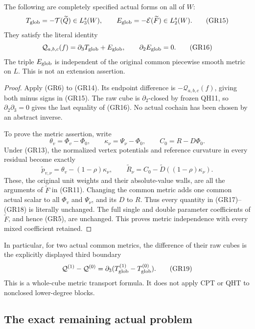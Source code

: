 \begin{theorem}
The following are completely specified actual forms on all of $W$:
\[
 T_{\rm glob}=-\mathcal T(\widetilde Q)\in L_3^s(W),\qquad
 E_{\rm glob}=-\mathcal E(\widetilde F)\in L_2^s(W).
 \tag{GR15}
\]
They satisfy the literal identity
\[
             \mathcal Q_{a,b,c}(f)=\partial_3T_{\rm glob}+E_{\rm glob},
                         \qquad \partial_2E_{\rm glob}=0.
 \tag{GR16}
\]
The triple $E_{\rm glob}$ is independent of the original common
piecewise smooth metric on $L$.  This is not an extension assertion.
\end{theorem}

\begin{proof}
Apply (GR6) to (GR14).  Its endpoint difference is
$-\mathcal Q_{a,b,c}(f)$, giving both minus signs in (GR15).
The raw cube is $\partial_2$-closed by frozen QH11, so
$\partial_2\partial_3=0$ gives the last equality of (GR16).
No actual cochain has been chosen by an abstract inverse.

To prove the metric assertion, write
\[
 \theta_v=\Phi_v-\Phi_0,\qquad
 \kappa_\nu=\Psi_\nu-\Phi_0,\qquad C_0=R-D\Phi_0.
 \tag{GR17}
\]
Under (GR13), the normalized vertex potentials and reference
curvature in every residual become exactly
\[
 \widetilde p_{v,\nu}=\theta_v-(1-\rho)\kappa_\nu,\qquad
 \widetilde R_\nu
                 =C_0-\widetilde D((1-\rho)\kappa_\nu).
 \tag{GR18}
\]
These, the original unit weights and their absolute-value walls,
are all the arguments of $\widetilde F$ in (GR11).
Changing the common metric adds one common actual scalar to all
$\Phi_v$ and $\Psi_\nu$, and its $D$ to $R$.  Thus every quantity
in (GR17)--(GR18) is literally unchanged.  The full single and
double parameter coefficients of $\widetilde F$, and hence (GR5),
are unchanged.  This proves metric independence with every mixed
coefficient retained.
\end{proof}

In particular, for two actual common metrics, the difference of
their raw cubes is the explicitly displayed third boundary
\[
 \mathcal Q^{(1)}-\mathcal Q^{(0)}
                   =\partial_3(T_{\rm glob}^{(1)}-T_{\rm glob}^{(0)}).
 \tag{GR19}
\]
This is a whole-cube metric transport formula.  It does not apply
CPT or QHT to nonclosed lower-degree blocks.

\subsection{The exact remaining actual problem}

